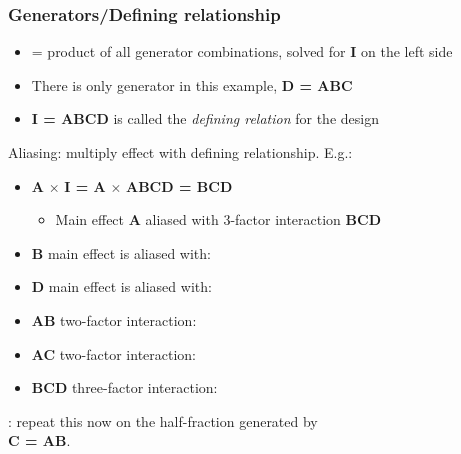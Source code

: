 \begin{frame}\frametitle{Generators/Defining relationship}
	\begin{itemize}
		\item	{\color{purple}{Defining relationship}} = product of all generator combinations, solved for \textbf{I} on the left side
		\item	There is only generator in this example, \textbf{D = ABC}
		\item	\textbf{I = ABCD} is called the \emph{defining relation} for the design
	\end{itemize}

	Aliasing: multiply effect with defining relationship. E.g.:
	\begin{itemize}
		\item	\textbf{A} $\times$ \textbf{I = A} $\times$ \textbf{ABCD = BCD}
		\begin{itemize}
			\item	Main effect \textbf{A} aliased with 3-factor interaction \textbf{BCD}
		\end{itemize}
		\item	\textbf{B} main effect is aliased with:
		\item	\textbf{D} main effect is aliased with:
		\item	\textbf{AB} two-factor interaction:
		\item	\textbf{AC} two-factor interaction:
		\item	\textbf{BCD} three-factor interaction:
	\end{itemize}
	{\color{myOrange}{Homework}}: repeat this now on the half-fraction generated by\\ \textbf{C = AB}.
\end{frame}


